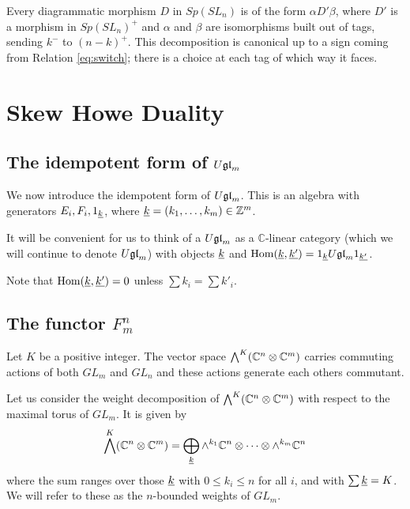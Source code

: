 \documentclass[11pt,leqno]{article}
\begin{document}
\begin{lem}
Every diagrammatic morphism $D$ in $Sp(SL_n)$ is of the form $\alpha D' \beta$, where $D'$ is a morphism in $Sp(SL_n)^+$ and $\alpha$ and $\beta$ are isomorphisms built out of tags, sending $k^-$ to $(n-k)^+$. This decomposition is canonical up to a sign coming from Relation \eqref{eq:switch}; there is a choice at each tag of which way it faces.
\end{lem}


\section{Skew Howe Duality}
\label{sec:skew-howe}

\subsection{The idempotent form of $ U\mathfrak{gl}_{m} $}
\label{sec:idemform}
We now introduce the idempotent form of $U\mathfrak{gl}_{m}$.  This is an algebra with generators $ E_i, F_i, 1_{\underline{k}} $, where $ {\underline{k}} = (k_1, \dots, k_m) \in \mathbb Z^m $.

It will be convenient for us to think of a $U\mathfrak{gl}_{m} $ as a $\mathbb C$-linear category (which we will continue to denote $U\mathfrak{gl}_{m}$) with objects $ {\underline{k}} $ and $ \operatorname{Hom}({\underline{k}}, {\underline{k'}}) = 1_{\underline{k}} U\mathfrak{gl}_{m} 1_{\underline{k'}}$.

Note that $ \operatorname{Hom}({\underline{k}}, {\underline{k'}}) = 0 $ unless $ \sum k_i = \sum k'_i $.


\subsection{The functor $F_m^n$}
Let $K $ be a positive integer.  The vector space $ \bigwedge^K(\mathbb C^n \otimes \mathbb C^m) $ carries commuting actions of both $ GL_m $ and $ GL_n $ and these actions generate each others commutant.  

Let us consider the weight decomposition of $\bigwedge^K(\mathbb C^n \otimes \mathbb C^m)$  with respect to the maximal torus of $ GL_m $.  It is given by 
\begin{equation}
 \bigwedge^K(\mathbb C^n \otimes \mathbb C^m) = \bigoplus_{{\underline{k}}} \wedge^{k_1} \mathbb C^n \otimes \cdots \otimes \wedge^{k_m} \mathbb C^n
 \end{equation}
where the sum ranges over those $ {\underline{k}} $ with $ 0 \le k_i \le n $ for all $ i $, and with $\sum {\underline{k}} = K$.  We will refer to these as the $n$-bounded weights of $ GL_m$.
\end{document}
